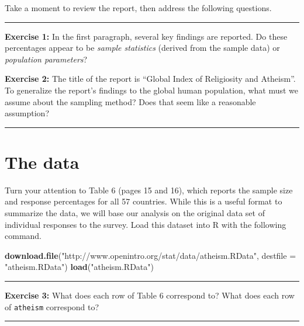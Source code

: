 \documentclass[]{book}
\newenvironment{Shaded}{\begin{snugshade}}{\end{snugshade}}
\newcommand{\KeywordTok}[1]{\textcolor[rgb]{0.13,0.29,0.53}{\textbf{{#1}}}}
\newcommand{\DataTypeTok}[1]{\textcolor[rgb]{0.13,0.29,0.53}{{#1}}}
\newcommand{\StringTok}[1]{\textcolor[rgb]{0.31,0.60,0.02}{{#1}}}
\newcommand{\NormalTok}[1]{{#1}}
\theoremstyle{definition}
\theoremstyle{definition}
\theoremstyle{definition}
\theoremstyle{remark}
\begin{document}
Take a moment to review the report, then address the following
questions.

\begin{center}\rule{0.5\linewidth}{\linethickness}\end{center}

\textbf{Exercise 1:} In the first paragraph, several key findings are
reported. Do these percentages appear to be \emph{sample statistics}
(derived from the sample data) or \emph{population parameters}?

\textbf{Exercise 2:} The title of the report is ``Global Index of
Religiosity and Atheism''. To generalize the report's findings to the
global human population, what must we assume about the sampling method?
Does that seem like a reasonable assumption?

\begin{center}\rule{0.5\linewidth}{\linethickness}\end{center}

\section{The data}\label{the-data-3}

Turn your attention to Table 6 (pages 15 and 16), which reports the
sample size and response percentages for all 57 countries. While this is
a useful format to summarize the data, we will base our analysis on the
original data set of individual responses to the survey. Load this
dataset into R with the following command.

\begin{Shaded}
\begin{Highlighting}[]
\KeywordTok{download.file}\NormalTok{(}\StringTok{"http://www.openintro.org/stat/data/atheism.RData"}\NormalTok{, }\DataTypeTok{destfile =} \StringTok{"atheism.RData"}\NormalTok{)}
\KeywordTok{load}\NormalTok{(}\StringTok{"atheism.RData"}\NormalTok{)}
\end{Highlighting}
\end{Shaded}

\begin{center}\rule{0.5\linewidth}{\linethickness}\end{center}

\textbf{Exercise 3:} What does each row of Table 6 correspond to? What
does each row of \texttt{atheism} correspond to?

\begin{center}\rule{0.5\linewidth}{\linethickness}\end{center}
\end{document}
